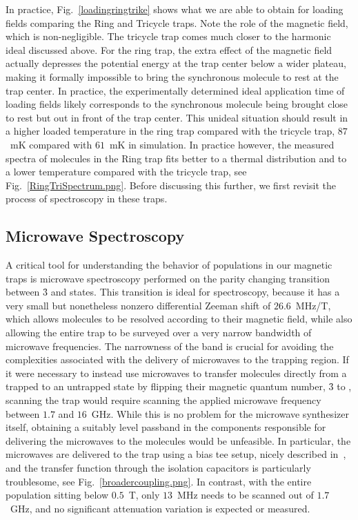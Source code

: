 In practice, Fig.~\ref{loadingringtrike} shows what we are able to obtain for loading fields comparing the Ring and Tricycle traps.
Note the role of the magnetic field, which is non-negligible.
The tricycle trap comes much closer to the harmonic ideal discussed above.
For the ring trap, the extra effect of the magnetic field actually depresses the potential energy at the trap center below a wider plateau, making it formally impossible to bring the synchronous molecule to rest at the trap center.
In practice, the experimentally determined ideal application time of loading fields likely corresponds to the synchronous molecule being brought close to rest but out in front of the trap center.
This unideal situation should result in a higher loaded temperature in the ring trap compared with the tricycle trap, $87$~mK compared with $61$~mK in simulation.
In practice however, the measured spectra of molecules in the Ring trap fits better to a thermal distribution and to a lower temperature compared with the tricycle trap, see Fig.~\ref{RingTriSpectrum.png}.
Before discussing this further, we first revisit the process of spectroscopy in these traps.

\subsection{Microwave Spectroscopy}

A critical tool for understanding the behavior of populations in our magnetic traps is microwave spectroscopy performed on the parity changing transition between \f3 and  states.
This transition is ideal for spectroscopy, because it has a very small but nonetheless nonzero differential Zeeman shift of $26.6$~MHz/T, which allows molecules to be resolved according to their magnetic field, while also allowing the entire trap to be surveyed over a very narrow bandwidth of microwave frequencies.
The narrowness of the band is crucial for avoiding the complexities associated with the delivery of microwaves to the trapping region.
If it were necessary to instead use microwaves to transfer molecules directly from a trapped to an untrapped state by flipping their magnetic quantum number, \f3 to , scanning the trap would require scanning the applied microwave frequency between $1.7$ and $16$~GHz.
While this is no problem for the microwave synthesizer itself, obtaining a suitably level passband in the components responsible for delivering the microwaves to the molecules would be unfeasible.
In particular, the microwaves are delivered to the trap using a bias tee setup, nicely described in~\citep[Fig.~5]{Stuhl2012uwave}, and the transfer function through the isolation capacitors is particularly troublesome, see Fig.~\ref{broadercoupling.png}.
In contrast, with the entire population sitting below $0.5$~T, only $13$~MHz needs to be scanned out of $1.7$~GHz, and no significant attenuation variation is expected or measured.


